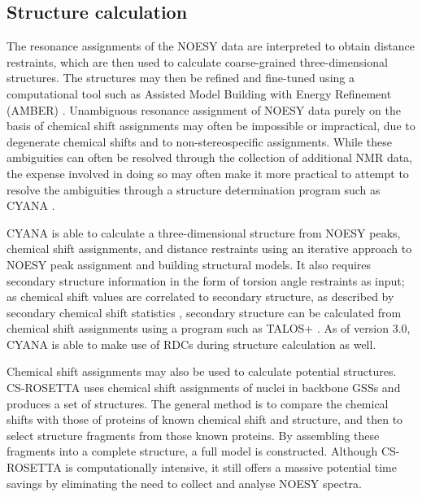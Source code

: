 \subsection*{Structure calculation}
The resonance assignments of the NOESY data are 
interpreted to obtain distance restraints, which are then used to calculate 
coarse-grained three-dimensional structures.  The structures may then be 
refined and fine-tuned using a computational tool such as 
Assisted Model Building with Energy Refinement (AMBER) \cite{amber}.  
Unambiguous resonance assignment of NOESY data purely on the basis of chemical 
shift assignments may often be impossible or impractical, due to degenerate 
chemical shifts and to non-stereospecific assignments.  While these 
ambiguities can often be resolved through the collection of additional 
NMR data, the expense involved in doing so may often make it more practical 
to attempt to resolve the ambiguities through a structure determination 
program such as CYANA \cite{cyana2004}.

CYANA is able to calculate a three-dimensional structure from NOESY peaks, 
chemical shift assignments, and distance restraints \cite{cyana2004, aria2003} 
using an iterative approach to NOESY peak assignment and building structural 
models.  It also requires secondary structure information in the form of 
torsion angle restraints as input; as
chemical shift values are correlated to secondary structure, as described
by secondary chemical shift statistics \cite{spera1991empirical}, secondary 
structure can be calculated from chemical shift assignments using a program 
such as TALOS+ \cite{talos+}.  As of version 3.0, CYANA is able to make use
of RDCs during structure calculation as well.

Chemical shift assignments may also be used to calculate potential structures.
CS-ROSETTA \cite{cs-rosetta} uses chemical shift assignments of nuclei in 
backbone GSSs and produces a set of structures.  The general method is to 
compare the chemical shifts with those of proteins of known chemical shift
and structure, and then to select structure fragments from those known 
proteins.  By assembling these fragments into a complete structure, a full
model is constructed.  Although CS-ROSETTA is computationally intensive, it
still offers a massive potential time savings by eliminating the need to
collect and analyse NOESY spectra.

